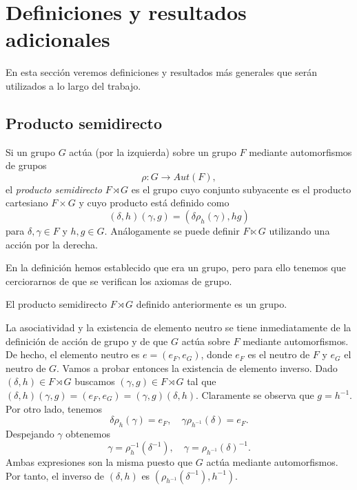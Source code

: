 \documentclass[TFG.tex]{subfiles}
\begin{document}
\section{Definiciones y resultados adicionales}


En esta sección veremos definiciones y resultados más generales  que serán utilizados a lo largo del trabajo. 
\subsection{Producto semidirecto}

\begin{defi}
Si un grupo $G$ actúa (por la izquierda) sobre un grupo $F$ mediante automorfismos de grupos
\[
\rho: G\to Aut(F),
\]
el \emph{producto semidirecto} $F\rtimes G$ es el grupo cuyo conjunto subyacente es el producto cartesiano $F\times G$ y cuyo producto está definido como 
\[
(\delta,h)(\gamma,g)=(\delta\rho_h(\gamma),hg)
\]
para $\delta,\gamma\in F$ y $h,g\in G$. Análogamente se puede definir $F\ltimes G$ utilizando una acción por la derecha. 
\end{defi}

En la definición hemos establecido que era un grupo, pero para ello tenemos que cerciorarnos de que se verifican los axiomas de grupo.

\begin{prop}
El producto semidirecto $F\rtimes G$ definido anteriormente es un grupo.
\end{prop}
\begin{dem}
La asociatividad y la existencia de elemento neutro se tiene inmediatamente de la definición de acción de grupo y de que $G$ actúa sobre $F$ mediante automorfismos. De hecho, el elemento neutro es $e=(e_F,e_G)$, donde $e_F$ es el neutro de $F$ y $e_G$ el neutro de $G$. Vamos a probar entonces la existencia de elemento inverso. Dado $(\delta,h)\in F\rtimes G$ buscamos $(\gamma,g)\in F\rtimes G$ tal que $(\delta,h)(\gamma,g)=(e_F,e_G)=(\gamma,g)(\delta,h)$. Claramente se observa que $g=h^{-1}$. Por otro lado, tenemos
\[
\delta\rho_h(\gamma)=e_F, \quad \gamma \rho_{h^{-1}}(\delta)=e_F.
\]
Despejando $\gamma$ obtenemos
\[
\gamma=\rho_{h}^{-1}(\delta^{-1}),\quad \gamma=\rho_{h^{-1}}(\delta)^{-1}.
\]
Ambas expresiones son la misma puesto que $G$ actúa mediante automorfismos. Por tanto, el inverso de $(\delta,h)$ es $(\rho_{h^{-1}}(\delta^{-1}), h^{-1})$. \QED
\end{dem}
\end{document}
